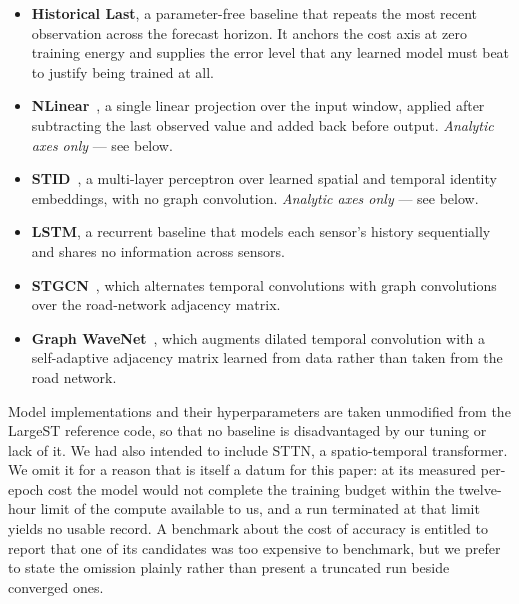 \documentclass[manuscript,screen,review]{acmart}
\begin{document}
\begin{itemize}
  \item \textbf{Historical Last}, a parameter-free baseline that repeats the
        most recent observation across the forecast horizon. It anchors the
        cost axis at zero training energy and supplies the error level that
        any learned model must beat to justify being trained at all.
  \item \textbf{NLinear}~\cite{zeng2023transformers}, a single linear
        projection over the input window, applied after subtracting the last
        observed value and added back before output. \emph{Analytic axes
        only} --- see below.
  \item \textbf{STID}~\cite{shao2022stid}, a multi-layer perceptron over
        learned spatial and temporal identity embeddings, with no graph
        convolution. \emph{Analytic axes only} --- see below.
  \item \textbf{LSTM}, a recurrent baseline that models each sensor's history
        sequentially and shares no information across sensors.
  \item \textbf{STGCN}~\cite{yu2018stgcn}, which alternates temporal
        convolutions with graph convolutions over the road-network adjacency
        matrix.
  \item \textbf{Graph WaveNet}~\cite{wu2019graphwavenet}, which augments
        dilated temporal convolution with a self-adaptive adjacency matrix
        learned from data rather than taken from the road network.
\end{itemize}

Model implementations and their hyperparameters are taken unmodified from the
LargeST reference code, so that no baseline is disadvantaged by our tuning or
lack of it. We had also intended to include STTN, a spatio-temporal
transformer. We omit it for a reason that is itself a datum for this paper: at
its measured per-epoch cost the model would not complete the training budget
within the twelve-hour limit of the compute available to us, and a run
terminated at that limit yields no usable record. A benchmark about the cost
of accuracy is entitled to report that one of its candidates was too expensive
to benchmark, but we prefer to state the omission plainly rather than present
a truncated run beside converged ones.
\end{document}
